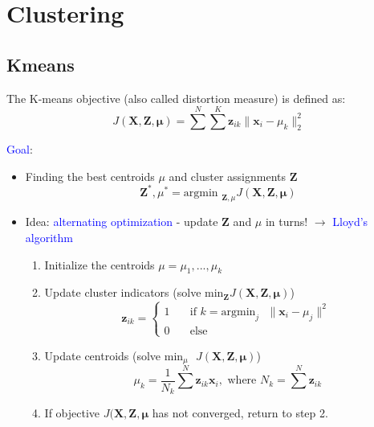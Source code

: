 \documentclass[a4paper,10pt,twoside=true,DIV=10,headsepline,plainheadsepline]{scrartcl}
\begin{document}
	\section{Clustering}
		\subsection{Kmeans}

		The K-means objective (also called distortion measure) is defined as:
		\begin{equation} 
			J(\mathbf{X}, \mathbf{Z}, \mathbf{\mu}) = \sum^N \sum^K \mathbf{z}_{ik} \| \mathbf{x}_i - \mu_k \|_2^2
		\end{equation}

		\textcolor{blue}{Goal}:

		\begin{itemize}[noitemsep]
			\item Finding the best centroids $\mu$ and cluster assignments $\mathbf{Z}$
			\begin{equation} 
				\mathbf{Z}^* , \mu^* = \textrm{argmin }_{\mathbf{Z}, \mu} J(\mathbf{X}, \mathbf{Z}, \mathbf{\mu}) 
			\end{equation}
			
			\item Idea: \textcolor{blue}{alternating optimization} - update $\mathbf{Z}$ and $\mu$ in turns! $\rightarrow$ \textcolor{blue}{Lloyd’s algorithm}

			\begin{enumerate}[noitemsep]
				\item Initialize the centroids $\mu = {\mu_1, ... , \mu_k}$
				\item Update cluster indicators (solve $\textrm{min}_{\mathbf{Z}} J(\mathbf{X}, \mathbf{Z}, \mathbf{\mu})$)
				\begin{equation} 
					\mathbf{z}_{ik} = \begin{cases}
    						1  & \quad \text{if } k = \text{argmin}_j \text{ } \|\mathbf{x}_i - \mu_j \|^2 \\
    						0  & \quad \text{else}
 						\end{cases}
				\end{equation}
				\item Update centroids (solve $\textrm{min}_{\mu} \textrm{ } J(\mathbf{X}, \mathbf{Z}, \mathbf{\mu})$)
				\begin{equation} 
					\mu_k = \frac{1}{N_k} \sum^N \mathbf{z}_{ik} \mathbf{x}_{i}, \textrm{ where } N_k = \sum^N \mathbf{z}_{ik}
				\end{equation}
				\item If objective $J(\mathbf{X}, \mathbf{Z}, \mathbf{\mu}$ has not converged, return to step 2.
			\end{enumerate}

		\end{itemize}
	
\end{document}
